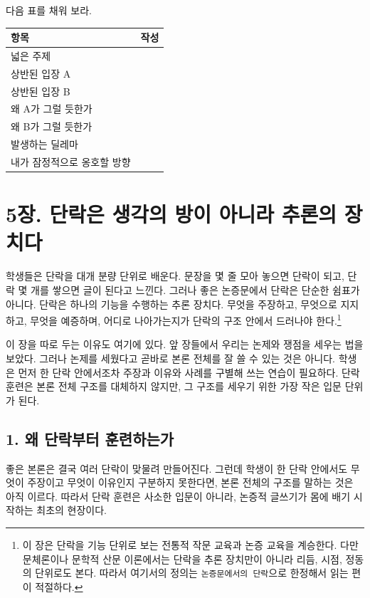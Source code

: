 다음 표를 채워 보라.

\begin{longtable}[]{@{}ll@{}}
\toprule\noalign{}
항목 & 작성 \\
\midrule\noalign{}
\endhead
\bottomrule\noalign{}
\endlastfoot
넓은 주제 & \\
상반된 입장 A & \\
상반된 입장 B & \\
왜 A가 그럴 듯한가 & \\
왜 B가 그럴 듯한가 & \\
발생하는 딜레마 & \\
내가 잠정적으로 옹호할 방향 & \\
\end{longtable}

\chapter{5장. 단락은 생각의 방이 아니라 추론의 장치다}\label{5uxc7a5-uxb2e8uxb77duxc740-uxc0dduxac01uxc758-uxbc29uxc774-uxc544uxb2c8uxb77c-uxcd94uxb860uxc758-uxc7a5uxce58uxb2e4}

학생들은 단락을 대개 분량 단위로 배운다. 문장을 몇 줄 모아 놓으면 단락이 되고, 단락 몇 개를 쌓으면 글이 된다고 느낀다. 그러나 좋은 논증문에서 단락은 단순한 쉼표가 아니다. 단락은 하나의 기능을 수행하는 추론 장치다. 무엇을 주장하고, 무엇으로 지지하고, 무엇을 예증하며, 어디로 나아가는지가 단락의 구조 안에서 드러나야 한다.\footnote{이 장은 단락을 기능 단위로 보는 전통적 작문 교육과 논증 교육을 계승한다. 다만 문체론이나 문학적 산문 이론에서는 단락을 추론 장치만이 아니라 리듬, 시점, 정동의 단위로도 본다. 따라서 여기서의 정의는 \texttt{논증문에서의\ 단락}으로 한정해서 읽는 편이 적절하다.}

이 장을 따로 두는 이유도 여기에 있다. 앞 장들에서 우리는 논제와 쟁점을 세우는 법을 보았다. 그러나 논제를 세웠다고 곧바로 본론 전체를 잘 쓸 수 있는 것은 아니다. 학생은 먼저 한 단락 안에서조차 주장과 이유와 사례를 구별해 쓰는 연습이 필요하다. 단락 훈련은 본론 전체 구조를 대체하지 않지만, 그 구조를 세우기 위한 가장 작은 입문 단위가 된다.

\section{1. 왜 단락부터 훈련하는가}\label{1-uxc65c-uxb2e8uxb77duxbd80uxd130-uxd6c8uxb828uxd558uxb294uxac00}

좋은 본론은 결국 여러 단락이 맞물려 만들어진다. 그런데 학생이 한 단락 안에서도 무엇이 주장이고 무엇이 이유인지 구분하지 못한다면, 본론 전체의 구조를 말하는 것은 아직 이르다. 따라서 단락 훈련은 사소한 입문이 아니라, 논증적 글쓰기가 몸에 배기 시작하는 최초의 현장이다.

